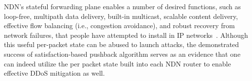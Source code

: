 NDN's stateful forwarding plane enables a number of desired functions, such as loop-free, multipath data delivery, built-in multicast, scalable content delivery, effective flow balancing (i.e., congestion avoidance), and robust recovery from network failures, that people have attempted to install in IP networks~\cite{adaptive-forwarding}. Although this useful per-packet state can be abused to launch attacks, the demonstrated success of satisfaction-based pushback algorithm serves as an evidence that one can indeed utilize the per packet state built into each NDN router to enable effective DDoS mitigation as well.  







